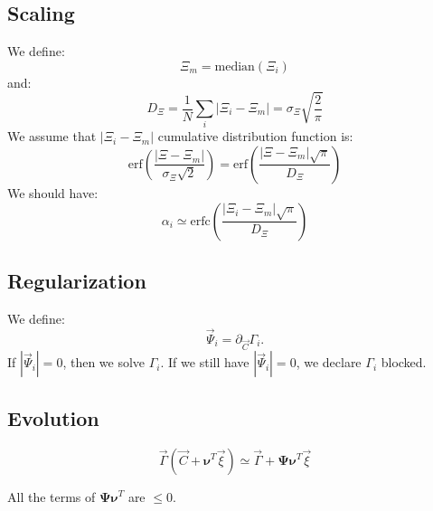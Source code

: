\documentclass[aps,12pt]{revtex4}
\begin{document}
\subsection{Scaling}
	
We define:
\begin{equation}
	\Xi_m=\mathrm{median}(\Xi_i)
\end{equation}
and:
\begin{equation}
	D_\Xi=\dfrac{1}{N}\sum_i\vert\Xi_i-\Xi_m\vert = \sigma_\Xi \sqrt{\dfrac{2}{\pi}}
\end{equation}
We assume that $\vert\Xi_i-\Xi_m\vert$ cumulative distribution function is:
\begin{equation}
	\mathrm{erf}\left(\dfrac{\vert\Xi-\Xi_m\vert}{\sigma_\Xi \sqrt{2}}\right) = \mathrm{erf}\left(\dfrac{\vert\Xi-\Xi_m\vert\sqrt{\pi}}{D_\Xi}\right) 
\end{equation}
We should have:
\begin{equation}
	\alpha_i \simeq \mathrm{erfc}\left(\dfrac{\vert\Xi_i-\Xi_m\vert\sqrt{\pi}}{D_\Xi}\right) \end{equation}



 	 	
\subsection{Regularization}
We define:
\begin{equation}
\vec{\Psi}_i = \partial_{\vec{C}} \Gamma_i.
\end{equation}
If $|\vec{\Psi}_i|=0$, then we solve $\Gamma_i$. If we still have $|\vec{\Psi}_i|=0$, we declare $\Gamma_i$ blocked.

\subsection{Evolution}

\begin{equation}
	\vec{\Gamma}(\vec{C}+\bm{\nu}^T \vec{\xi}) \simeq \vec{\Gamma} + \bm{\Psi} \bm{\nu}^T \vec{\xi}
\end{equation}	

All the terms of $	\bm{\Psi} \bm{\nu}^T $ are $\leq 0$.




 


 
\end{document}
